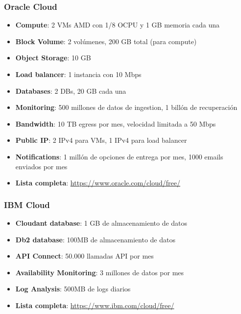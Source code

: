 \subsubsection*{Oracle Cloud}
\begin{itemize}
	\item \textbf{Compute}: 2 VMs AMD con 1/8 OCPU y 1 GB memoria cada una
	\item \textbf{Block Volume}: 2 volúmenes, 200 GB total (para compute)
	\item \textbf{Object Storage}: 10 GB
	\item \textbf{Load balancer}: 1 instancia con 10 Mbps
	\item \textbf{Databases}: 2 DBs, 20 GB cada una
	\item \textbf{Monitoring}: 500 millones de datos de ingestion, 1 billón de recuperación
	\item \textbf{Bandwidth}: 10 TB egress por mes, velocidad limitada a 50 Mbps
	\item \textbf{Public IP}: 2 IPv4 para VMs, 1 IPv4 para load balancer
	\item \textbf{Notifications}: 1 millón de opciones de entrega por mes, 1000 emails enviados por mes
	\item \textbf{Lista completa}: \url{https://www.oracle.com/cloud/free/}
\end{itemize}

\subsubsection*{IBM Cloud}
\begin{itemize}
	\item \textbf{Cloudant database}: 1 GB de almacenamiento de datos
	\item \textbf{Db2 database}: 100MB de almacenamiento de datos
	\item \textbf{API Connect}: 50.000 llamadas API por mes
	\item \textbf{Availability Monitoring}: 3 millones de datos por mes
	\item \textbf{Log Analysis}: 500MB de logs diarios
	\item \textbf{Lista completa}: \url{https://www.ibm.com/cloud/free/}
\end{itemize}

